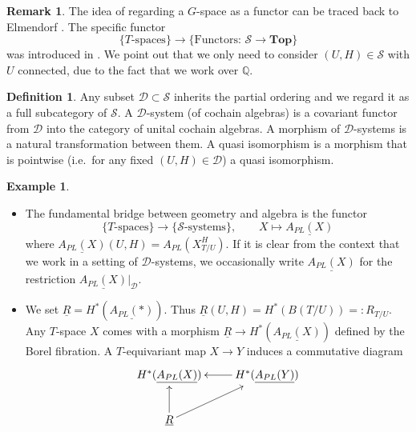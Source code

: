 \documentclass[12pt,a4paper]{article}
\theoremstyle{definition}
\newtheorem{rem}[thm]{Remark}
\newtheorem{defn}[thm]{Definition}
\newtheorem{ex}[thm]{Example}
\begin{document}
\begin{rem}
The idea of regarding a $G$-space as a functor can be traced back to Elmendorf \cite{Elmendorf}. The specific functor \[\{T\text{-spaces}\}\longrightarrow \{ \text{Functors: }\mathcal{S}\rightarrow\textbf{Top}\}\] was introduced in \cite[Section 4]{ScullMendes}. We point out that we only need to consider $(U,H)\in\mathcal{S}$ with $U$ connected, due to the fact that we work over $\mathbb{Q}$.
\end{rem}


\begin{defn}
Any subset $\mathcal{D}\subset \mathcal{S}$ inherits the partial ordering and we regard it as a full subcategory of $\mathcal{S}$. A $\mathcal{D}$-system (of cochain algebras) is a covariant functor from $\mathcal{D}$ into the category of unital cochain algebras.
A morphism of $\mathcal{D}$-systems is a natural transformation between them. A quasi isomorphism is a morphism that is pointwise (i.e.\ for any fixed $(U,H)\in\mathcal{D}$) a quasi isomorphism.
\end{defn}



\begin{ex}
\begin{itemize}
\item
The fundamental bridge between geometry and algebra is the functor
\[\{T\text{-spaces}\}\longrightarrow \{\mathcal{S}\text{-systems}\},\qquad
X\mapsto\underline{A_{PL}(X)}\] where $\underline{A_{PL}(X)}(U,H)= A_{PL}(X^H_{T/U})$. If it is clear from the context that we work in a setting of $\mathcal{D}$-systems, we occasionally write $\underline{A_{PL}(X)}$ for the restriction $\underline{A_{PL}(X)}|_\mathcal{D}$.

\item We set $\underline{R}=H^*(\underline{A_{PL}(*)})$. Thus $\underline{R}(U,H)=H^*(B(T/U))=:R_{T/U}$. Any $T$-space $X$ comes with a morphism $\underline{R}\rightarrow H^*(\underline{A_{PL}(X)})$ defined by the Borel fibration. A $T$-equivariant map $X\rightarrow Y$ induces a commutative diagram \[\xymatrix{
H^*(\underline{A_{PL}(X)})& \ar[l] H^*(\underline{A_{PL}(Y)})\\
\underline{R}\ar[u]\ar[ur]&
}\]
\end{itemize}
\end{ex}
\end{document}
